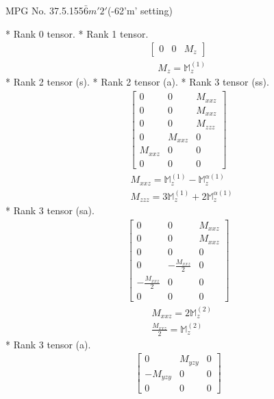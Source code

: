\documentclass[fleqn,8pt,landscape]{jsarticle}
\begin{document}
\setcounter{MaxMatrixCols}{32}

\renewcommand{\tablename}{Table~}
\renewcommand{\figurename}{Figure~}
\begin{center}
\LARGE
MPG No. 37.5.155\quad$\bar{6}m'2'$\quad(-62'm' setting)
\end{center}
* Rank 0 tensor.
* Rank 1 tensor.
\begin{align*}
\begin{bmatrix} 0 & 0 & M_{z} \end{bmatrix}
\end{align*}
\begin{align*}
& M_{z} = \mathbb{M}_{z}^{(1)}
\end{align*}
* Rank 2 tensor (s).
* Rank 2 tensor (a).
* Rank 3 tensor (ss).
\begin{align*}
\begin{bmatrix} 0 & 0 & M_{xxz} \\ 0 & 0 & M_{xxz} \\ 0 & 0 & M_{zzz} \\ 0 & M_{xxz} & 0 \\ M_{xxz} & 0 & 0 \\ 0 & 0 & 0 \end{bmatrix}
\end{align*}
\begin{align*}
& M_{xxz} = \mathbb{M}_{z}^{(1)} - \mathbb{M}_{z}^{\alpha(1)} \\
& M_{zzz} = 3 \mathbb{M}_{z}^{(1)} + 2 \mathbb{M}_{z}^{\alpha(1)}
\end{align*}
* Rank 3 tensor (sa).
\begin{align*}
\begin{bmatrix} 0 & 0 & M_{xxz} \\ 0 & 0 & M_{xxz} \\ 0 & 0 & 0 \\ 0 & - \frac{M_{xxz}}{2} & 0 \\ - \frac{M_{xxz}}{2} & 0 & 0 \\ 0 & 0 & 0 \end{bmatrix}
\end{align*}
\begin{align*}
& M_{xxz} = 2 \mathbb{M}_{z}^{(2)} \\
& \frac{M_{xxz}}{2} = \mathbb{M}_{z}^{(2)}
\end{align*}
* Rank 3 tensor (a).
\begin{align*}
\begin{bmatrix} 0 & M_{yzy} & 0 \\ - M_{yzy} & 0 & 0 \\ 0 & 0 & 0 \end{bmatrix}
\end{align*}
\end{document}
